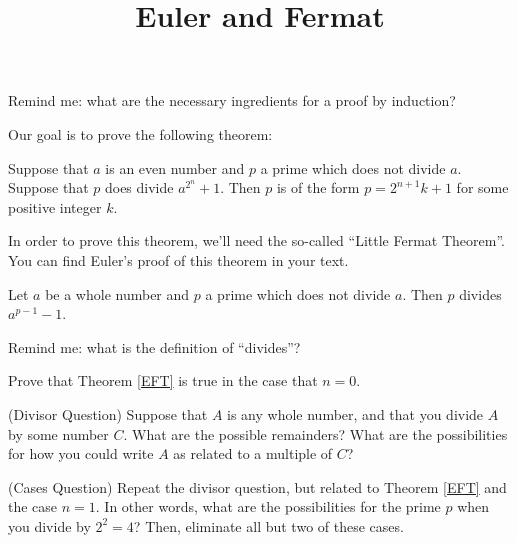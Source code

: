 \documentclass[handout,nooutcomes]{ximera}
\title{Euler and Fermat}
\begin{document}
\begin{abstract}
    
\end{abstract}
\maketitle

\begin{question}
Remind me: what are the necessary ingredients for a proof by induction?
\end{question}

Our goal is to prove the following theorem: 
\begin{theorem}\label{EFT}
Suppose that $a$ is an even number and $p$ a prime which does not divide $a$.  Suppose that 
$p$ does divide $a^{2^n} + 1$.  Then $p$ is of the form $p = 2^{n+1}k + 1$ for some positive 
integer $k$.  
\end{theorem}

In order to prove this theorem, we'll need the so-called ``Little Fermat Theorem''.  You can 
find Euler's proof of this theorem in your text.
\begin{theorem}
Let $a$ be a whole number and $p$ a prime which does not divide $a$.  Then $p$ divides 
$a^{p-1} - 1$.
\end{theorem}

\begin{question}
Remind me: what is the definition of ``divides''?
\end{question}

\begin{question}
Prove that Theorem \ref{EFT} is true in the case that $n=0$.
\end{question}

\begin{question}
(Divisor Question) Suppose that $A$ is any whole number, and that you divide $A$ by some number $C$.  What 
are the possible remainders?  What are the possibilities for how you could write $A$ as 
related to a multiple of $C$?
\end{question}

\begin{question} 
(Cases Question) Repeat the divisor question, but related to Theorem \ref{EFT} and the case $n=1$.  
In other words, what are the possibilities for the prime $p$ when you divide by $2^2 = 4$?  
Then, eliminate all but two of these cases.
\end{question}
\end{document}
